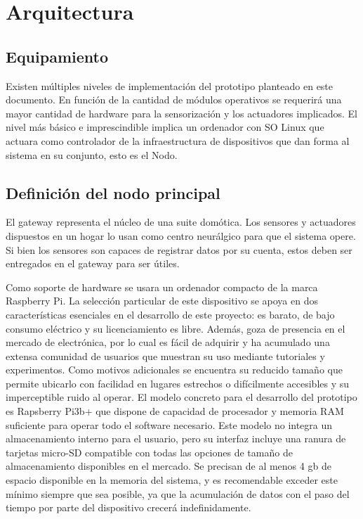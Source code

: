 \cleardoublepage

\chapter{Arquitectura}
\label{makereference4}

\section{Equipamiento}
\label{makereference4.1}

Existen múltiples niveles de implementación del prototipo planteado en este documento. En función de la cantidad de módulos operativos se requerirá una mayor cantidad de hardware para la sensorización y los actuadores implicados. El nivel más básico e imprescindible implica un ordenador con SO Linux que actuara como controlador de la infraestructura de dispositivos que dan forma al sistema en su conjunto, esto es el Nodo.

\section{Definición del nodo principal}
\label{makereference4.2}

El \gls{gateway} representa el núcleo de una suite domótica. Los sensores y actuadores dispuestos en un hogar lo usan como centro neurálgico para que el sistema opere. Si bien los sensores son capaces de registrar datos por su cuenta, estos deben ser entregados en el \gls{gateway} para ser útiles. 

Como soporte de hardware  se usara un ordenador compacto de la marca Raspberry Pi. La selección particular de este dispositivo se apoya en dos características esenciales en el desarrollo de este proyecto: es barato, de bajo consumo eléctrico y su licenciamiento es libre. Además, goza de presencia en el mercado de electrónica, por lo cual es fácil de adquirir y ha acumulado una extensa comunidad de usuarios que muestran su uso mediante tutoriales y experimentos. Como motivos adicionales se encuentra su reducido tamaño que permite ubicarlo con facilidad en lugares estrechos o difícilmente accesibles y su imperceptible ruido al operar. El modelo concreto para el desarrollo del prototipo es Rapsberry Pi3b+ que dispone de capacidad de procesador y memoria RAM suficiente para operar todo el software necesario. Este modelo no integra un almacenamiento interno para el usuario, pero su interfaz incluye una ranura de tarjetas micro-SD compatible con todas las opciones de tamaño de almacenamiento disponibles en el mercado. Se precisan de al menos 4 \gls{gb} de espacio disponible en la memoria del sistema, y es recomendable exceder este mínimo siempre que sea posible, ya que la acumulación de datos con el paso del tiempo por parte del dispositivo crecerá indefinidamente.

